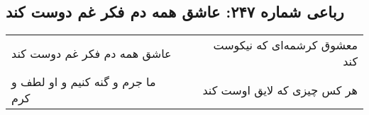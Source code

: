 \begin{center}
\section*{رباعی شماره ۲۴۷: عاشق همه دم فکر غم دوست کند}
\label{sec:sh247}
\begin{longtable}{l p{0.5cm} r}
عاشق همه دم فکر غم دوست کند
&&
معشوق کرشمه‌ای که نیکوست کند
\\
ما جرم و گنه کنیم و او لطف و کرم
&&
هر کس چیزی که لایق اوست کند
\\
\end{longtable}
\end{center}
